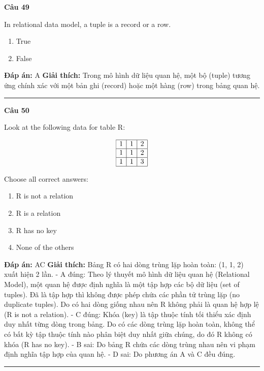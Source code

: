 \documentclass[11pt,a4paper]{article}
\newenvironment{question}[1]{%
  \par\vspace{1em}\noindent\textbf{\large Câu #1}\par\vspace{0.4em}
}{%
  \par\vspace{1em}\hrule\vspace{0.6em}
}
\newenvironment{choices}{%
  \begin{enumerate}[label=\textbf{\Alph*.},leftmargin=2.2em,itemsep=2pt,topsep=3pt]
}{%
  \end{enumerate}
}
\newcommand{\choice}{\item}
\begin{document}
\begin{question}{49}
In relational data model, a tuple is a record or a row.
\begin{choices}
\choice True
\choice False
\end{choices}
\textbf{Đáp án:} A
\textbf{Giải thích:} Trong mô hình dữ liệu quan hệ, một bộ (tuple) tương ứng chính xác với một bản ghi (record) hoặc một hàng (row) trong bảng quan hệ.
\end{question}

\begin{question}{50}
Look at the following data for table R:

$$\begin{array}{|c|c|c|}\hline 1 & 1 & 2 \\\hline 1 & 1 & 2 \\\hline 1 & 1 & 3 \\\hline\end{array}$$

Choose all correct answers:
\begin{choices}
\choice R is not a relation
\choice R is a relation
\choice R has no key
\choice None of the others
\end{choices}
\textbf{Đáp án:} AC
\textbf{Giải thích:} Bảng R có hai dòng trùng lặp hoàn toàn: (1, 1, 2) xuất hiện 2 lần.
- A đúng: Theo lý thuyết mô hình dữ liệu quan hệ (Relational Model), một quan hệ được định nghĩa là một tập hợp các bộ dữ liệu (set of tuples). Đã là tập hợp thì không được phép chứa các phần tử trùng lặp (no duplicate tuples). Do có hai dòng giống nhau nên R không phải là quan hệ hợp lệ (R is not a relation).
- C đúng: Khóa (key) là tập thuộc tính tối thiểu xác định duy nhất từng dòng trong bảng. Do có các dòng trùng lặp hoàn toàn, không thể có bất kỳ tập thuộc tính nào phân biệt duy nhất giữa chúng, do đó R không có khóa (R has no key).
- B sai: Do bảng R chứa các dòng trùng nhau nên vi phạm định nghĩa tập hợp của quan hệ.
- D sai: Do phương án A và C đều đúng.
\end{question}
\end{document}
